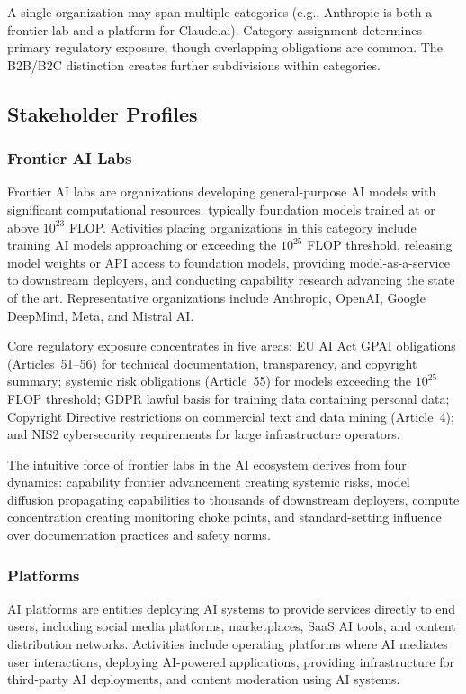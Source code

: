 \documentclass[11pt,a4paper]{article}
\begin{document}
A single organization may span multiple categories (e.g., Anthropic is both a frontier lab and a platform for Claude.ai). Category assignment determines primary regulatory exposure, though overlapping obligations are common. The B2B/B2C distinction creates further subdivisions within categories.

\subsection{Stakeholder Profiles}

\subsubsection{Frontier AI Labs}

Frontier AI labs are organizations developing general-purpose AI models with significant computational resources, typically foundation models trained at or above $10^{23}$ FLOP. Activities placing organizations in this category include training AI models approaching or exceeding the $10^{25}$ FLOP threshold, releasing model weights or API access to foundation models, providing model-as-a-service to downstream deployers, and conducting capability research advancing the state of the art. Representative organizations include Anthropic, OpenAI, Google DeepMind, Meta, and Mistral AI.

Core regulatory exposure concentrates in five areas: EU AI Act GPAI obligations (Articles~51--56) for technical documentation, transparency, and copyright summary; systemic risk obligations (Article~55) for models exceeding the $10^{25}$ FLOP threshold; GDPR lawful basis for training data containing personal data; Copyright Directive restrictions on commercial text and data mining (Article~4); and NIS2 cybersecurity requirements for large infrastructure operators.

The intuitive force of frontier labs in the AI ecosystem derives from four dynamics: capability frontier advancement creating systemic risks, model diffusion propagating capabilities to thousands of downstream deployers, compute concentration creating monitoring choke points, and standard-setting influence over documentation practices and safety norms.

\subsubsection{Platforms}

AI platforms are entities deploying AI systems to provide services directly to end users, including social media platforms, marketplaces, SaaS AI tools, and content distribution networks. Activities include operating platforms where AI mediates user interactions, deploying AI-powered applications, providing infrastructure for third-party AI deployments, and content moderation using AI systems.
\end{document}
